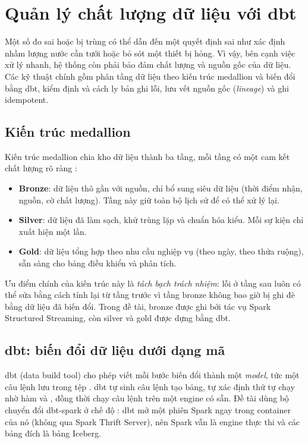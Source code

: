 \section{Quản lý chất lượng dữ liệu với dbt}
\label{sec:2-dbt-quality}

Một số đo sai hoặc bị trùng có thể dẫn đến một quyết định sai như xác định nhầm lượng nước cần tưới hoặc bỏ sót một thiết bị hỏng. Vì vậy, bên cạnh việc xử lý nhanh, hệ thống còn phải bảo đảm chất lượng và nguồn gốc của dữ liệu. Các kỹ thuật chính gồm phân tầng dữ liệu theo kiến trúc medallion và biến đổi bằng dbt, kiểm định và cách ly bản ghi lỗi, lưu vết nguồn gốc (\emph{lineage}) và ghi idempotent.

\subsection{Kiến trúc medallion}
\label{sec:2-medallion}

Kiến trúc medallion chia kho dữ liệu thành ba tầng, mỗi tầng có một cam kết chất lượng rõ ràng \cite{databricks_medallion}:

\begin{itemize}
  \item \textbf{Bronze}: dữ liệu thô gần với nguồn, chỉ bổ sung siêu dữ liệu (thời điểm nhận, nguồn, cờ chất lượng). Tầng này giữ toàn bộ lịch sử để có thể xử lý lại.
  \item \textbf{Silver}: dữ liệu đã làm sạch, khử trùng lặp và chuẩn hóa kiểu. Mỗi sự kiện chỉ xuất hiện một lần.
  \item \textbf{Gold}: dữ liệu tổng hợp theo nhu cầu nghiệp vụ (theo ngày, theo thửa ruộng), sẵn sàng cho bảng điều khiển và phân tích.
\end{itemize}

Ưu điểm chính của kiến trúc này là \emph{tách bạch trách nhiệm}: lỗi ở tầng sau luôn có thể sửa bằng cách tính lại từ tầng trước vì tầng bronze không bao giờ bị ghi đè bằng dữ liệu đã biến đổi. Trong đề tài, bronze được ghi bởi tác vụ Spark Structured Streaming, còn silver và gold được dựng bằng dbt.

\subsection{dbt: biến đổi dữ liệu dưới dạng mã}
\label{sec:2-dbt}

dbt (data build tool) cho phép viết mỗi bước biến đổi thành một \emph{model}, tức một câu lệnh  lưu trong tệp  \cite{dbt_docs}. dbt tự sinh câu lệnh tạo bảng, tự xác định thứ tự chạy nhờ hàm  và , đồng thời chạy câu lệnh trên một engine có sẵn. Đề tài dùng bộ chuyển đổi dbt-spark ở chế độ : dbt mở một phiên Spark ngay trong container của nó (không qua Spark Thrift Server), nên Spark vẫn là engine thực thi và các bảng đích là bảng Iceberg.

